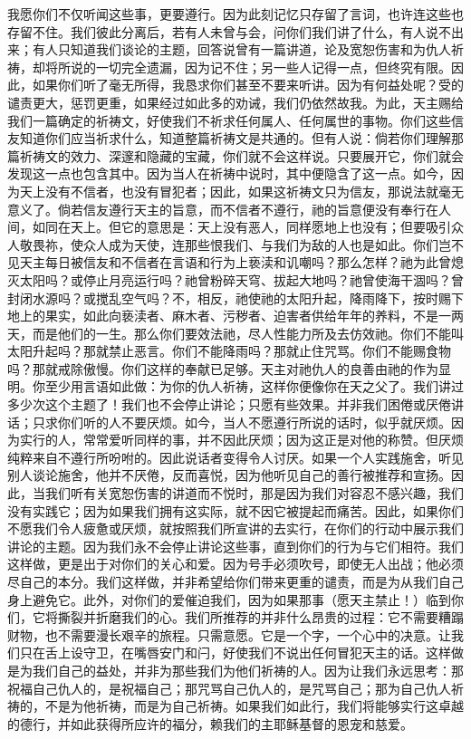 我愿你们不仅听闻这些事，更要遵行。因为此刻记忆只存留了言词，也许连这些也存留不住。我们彼此分离后，若有人未曾与会，问你们我们讲了什么，有人说不出来；有人只知道我们谈论的主题，回答说曾有一篇讲道，论及宽恕伤害和为仇人祈祷，却将所说的一切完全遗漏，因为记不住；另一些人记得一点，但终究有限。因此，如果你们听了毫无所得，我恳求你们甚至不要来听讲。因为有何益处呢？受的谴责更大，惩罚更重，如果经过如此多的劝诫，我们仍依然故我。为此，天主赐给我们一篇确定的祈祷文，好使我们不祈求任何属人、任何属世的事物。你们这些信友知道你们应当祈求什么，知道整篇祈祷文是共通的。但有人说：倘若你们理解那篇祈祷文的效力、深邃和隐藏的宝藏，你们就不会这样说。只要展开它，你们就会发现这一点也包含其中。因为当人在祈祷中说时，其中便隐含了这一点。如今，因为天上没有不信者，也没有冒犯者；因此，如果这祈祷文只为信友，那说法就毫无意义了。倘若信友遵行天主的旨意，而不信者不遵行，祂的旨意便没有奉行在人间，如同在天上。但它的意思是：天上没有恶人，同样愿地上也没有；但要吸引众人敬畏祢，使众人成为天使，连那些恨我们、与我们为敌的人也是如此。你们岂不见天主每日被信友和不信者在言语和行为上亵渎和讥嘲吗？那么怎样？祂为此曾熄灭太阳吗？或停止月亮运行吗？祂曾粉碎天穹、拔起大地吗？祂曾使海干涸吗？曾封闭水源吗？或搅乱空气吗？不，相反，祂使祂的太阳升起，降雨降下，按时赐下地上的果实，如此向亵渎者、麻木者、污秽者、迫害者供给年年的养料，不是一两天，而是他们的一生。那么你们要效法祂，尽人性能力所及去仿效祂。你们不能叫太阳升起吗？那就禁止恶言。你们不能降雨吗？那就止住咒骂。你们不能赐食物吗？那就戒除傲慢。你们这样的奉献已足够。天主对祂仇人的良善由祂的作为显明。你至少用言语如此做：为你的仇人祈祷，这样你便像你在天之父了。我们讲过多少次这个主题了！我们也不会停止讲论；只愿有些效果。并非我们困倦或厌倦讲话；只求你们听的人不要厌烦。如今，当人不愿遵行所说的话时，似乎就厌烦。因为实行的人，常常爱听同样的事，并不因此厌烦；因为这正是对他的称赞。但厌烦纯粹来自不遵行所吩咐的。因此说话者变得令人讨厌。如果一个人实践施舍，听见别人谈论施舍，他并不厌倦，反而喜悦，因为他听见自己的善行被推荐和宣扬。因此，当我们听有关宽恕伤害的讲道而不悦时，那是因为我们对容忍不感兴趣，我们没有实践它；因为如果我们拥有这实际，就不因它被提起而痛苦。因此，如果你们不愿我们令人疲惫或厌烦，就按照我们所宣讲的去实行，在你们的行动中展示我们讲论的主题。因为我们永不会停止讲论这些事，直到你们的行为与它们相符。我们这样做，更是出于对你们的关心和爱。因为号手必须吹号，即使无人出战；他必须尽自己的本分。我们这样做，并非希望给你们带来更重的谴责，而是为从我们自己身上避免它。此外，对你们的爱催迫我们，因为如果那事（愿天主禁止！）临到你们，它将撕裂并折磨我们的心。我们所推荐的并非什么昂贵的过程：它不需要糟蹋财物，也不需要漫长艰辛的旅程。只需意愿。它是一个字，一个心中的决意。让我们只在舌上设守卫，在嘴唇安门和闩，好使我们不说出任何冒犯天主的话。这样做是为我们自己的益处，并非为那些我们为他们祈祷的人。因为让我们永远思考：那祝福自己仇人的，是祝福自己；那咒骂自己仇人的，是咒骂自己；那为自己仇人祈祷的，不是为他祈祷，而是为自己祈祷。如果我们如此行，我们将能够实行这卓越的德行，并如此获得所应许的福分，赖我们的主耶稣基督的恩宠和慈爱。\par

